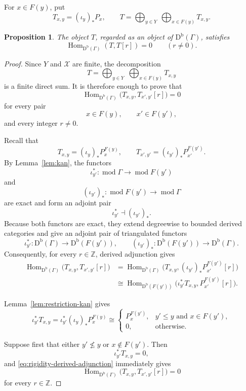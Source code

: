 \documentclass[12pt,a4paper,english,reqno]{amsart}
\theoremstyle{plain}
\newtheorem{proposition}[theorem]{Proposition}
\theoremstyle{definition}
\newcommand{\Db}{\mathrm D^{\mathrm b}}
\newcommand{\Hom}{\operatorname{Hom}}
\newcommand{\X}{\mathcal X}
\newcommand{\G}{\Gamma}
\newcommand{\modu}{\operatorname{mod}}
\begin{document}
For $x\in F(y)$, put
\begin{equation}
 T_{x,y}=(\iota_y)_*P_x,\qquad
 T=\bigoplus_{y\in Y}\ \bigoplus_{x\in F(y)}T_{x,y}.
\label{eq:T-relative}
\end{equation}

\begin{proposition}
\label{prop:T-rigid}
The object $T$, regarded as an object of $\Db(\G)$, satisfies
\[
 \Hom_{\Db(\G)}(T,T[r])=0\qquad(r\neq0).
\]
\end{proposition}

\begin{proof}
Since $Y$ and $\X$ are finite, the decomposition
\[
T=
\bigoplus_{y\in Y}\;
\bigoplus_{x\in F(y)}T_{x,y}
\]
is a finite direct sum. It is therefore enough to prove that
\[
\Hom_{\Db(\G)}
\bigl(T_{x,y},T_{x',y'}[r]\bigr)=0
\]
for every pair
\[
x\in F(y),\qquad x'\in F(y'),
\]
and every integer $r\neq0$.

Recall that
\[
T_{x,y}=(\iota_y)_*P_x^{F(y)},
\qquad
T_{x',y'}=(\iota_{y'})_*P_{x'}^{F(y')}.
\]
By Lemma~\ref{lem:kan}, the functors
\[
\iota_{y'}^*:\modu\G\longrightarrow\modu F(y')
\]
and
\[
(\iota_{y'})_*:\modu F(y')\longrightarrow\modu\G
\]
are exact and form an adjoint pair
\[
\iota_{y'}^*\dashv(\iota_{y'})_*.
\]
Because both functors are exact, they extend degreewise to bounded
derived categories and give an adjoint pair of triangulated functors
\[
\iota_{y'}^*:\Db(\G)\longrightarrow\Db(F(y')),
\qquad
(\iota_{y'})_*:\Db(F(y'))\longrightarrow\Db(\G).
\]
Consequently, for every $r\in\mathbb Z$, derived adjunction gives
\begin{align}
\Hom_{\Db(\G)}
\bigl(T_{x,y},T_{x',y'}[r]\bigr)
&=
\Hom_{\Db(\G)}
\bigl(T_{x,y},(\iota_{y'})_*P_{x'}^{F(y')}[r]\bigr)
\nonumber\\
&\cong
\Hom_{\Db(F(y'))}
\bigl(\iota_{y'}^*T_{x,y},P_{x'}^{F(y')}[r]\bigr).
\label{eq:rigidity-derived-adjunction}
\end{align}

Lemma~\ref{lem:restriction-kan} gives
\[
\iota_{y'}^*T_{x,y}
=
\iota_{y'}^*(\iota_y)_*P_x^{F(y)}
\cong
\begin{cases}
P_x^{F(y')},
  & y'\leq y\text{ and }x\in F(y'),\\
0,
  & \text{otherwise}.
\end{cases}
\]

Suppose first that either $y'\nleq y$ or $x\notin F(y')$. Then
\[
\iota_{y'}^*T_{x,y}=0,
\]
and \eqref{eq:rigidity-derived-adjunction} immediately gives
\[
\Hom_{\Db(\G)}
\bigl(T_{x,y},T_{x',y'}[r]\bigr)=0
\]
for every $r\in\mathbb Z$.


\end{proof}
\end{document}
